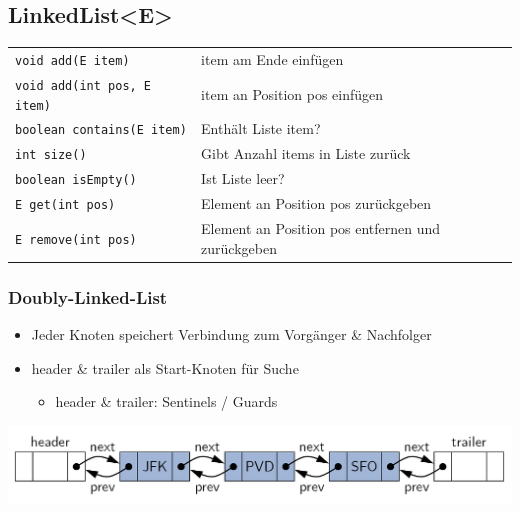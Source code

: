 \documentclass[a4paper, landscape, 8pt]{scrartcl}
\begin{document}
\begin{multicols*}{4}
            \subsection{LinkedList<E>}
                \begin{tabular}{l|p{3cm}}
                    \texttt{void add(E item)} & item am Ende einfügen \\
                    \texttt{void add(int pos, E item)} & item an Position pos einfügen \\
                    \texttt{boolean contains(E item)} & Enthält Liste item? \\
                    \texttt{int size()} & Gibt Anzahl items in Liste zurück \\
                    \texttt{boolean isEmpty()} & Ist Liste leer? \\
                    \texttt{E get(int pos)} & Element an Position pos zurückgeben \\
                    \texttt{E remove(int pos)} & Element an Position pos entfernen und zurückgeben \\
                \end{tabular}
            
                \subsubsection{Doubly-Linked-List}
                    \begin{itemize}
                        \item Jeder Knoten speichert Verbindung zum Vorgänger \& Nachfolger
                        \item header \& trailer als Start-Knoten für Suche
                        \begin{itemize}
                            \item header \& trailer: Sentinels / Guards
                        \end{itemize}
                    \end{itemize}
                    \newline
                    \includegraphics[scale=0.2,width=\columnwidth]{graphic/02_doubly-linkedlist}


\end{multicols*}
\end{document}
